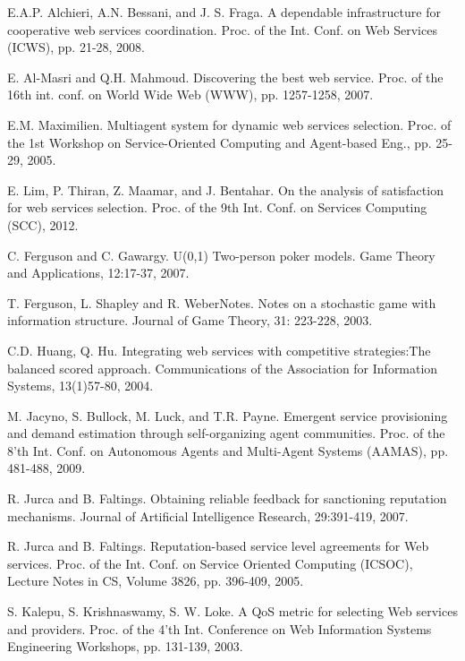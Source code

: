 \documentclass[fleqn]{singlecol-new}
\begin{document}


\begin{thebibliography}{1}

\small

E.A.P. Alchieri, A.N. Bessani, and J. S. Fraga.  A dependable
infrastructure for cooperative web services coordination. Proc. of
the Int. Conf. on Web Services (ICWS), pp. 21-28, 2008.


E. Al-Masri and Q.H. Mahmoud. Discovering the best web service.
Proc. of the 16th int. conf. on World Wide Web (WWW), pp.
1257-1258, 2007.

E.M. Maximilien. Multiagent system for dynamic web services
selection. Proc. of the 1st Workshop on Service-Oriented Computing
and Agent-based Eng., pp. 25-29, 2005.


E. Lim, P. Thiran, Z. Maamar, and J. Bentahar. On the analysis of
satisfaction for web services selection. Proc. of the 9th Int.
Conf. on Services Computing (SCC), 2012.

C. Ferguson and C. Gawargy. U(0,1) Two-person poker models. Game
Theory and Applications, 12:17-37, 2007.

T. Ferguson, L. Shapley and R. WeberNotes. Notes on a stochastic
game with information structure. Journal of Game Theory, 31:
223-228, 2003.

C.D. Huang, Q. Hu.  Integrating web services with competitive
strategies:The balanced scored approach. Communications of the
Association for Information Systems, 13(1)57-80, 2004.


M. Jacyno, S. Bullock, M. Luck, and T.R. Payne. Emergent service
provisioning and demand estimation through self-organizing agent
communities. Proc. of the 8'th Int. Conf. on Autonomous Agents and
Multi-Agent Systems (AAMAS), pp. 481-488, 2009.


R. Jurca and B. Faltings. Obtaining reliable feedback for
sanctioning reputation mechanisms. Journal of Artificial
Intelligence Research, 29:391-419, 2007.


R. Jurca and B. Faltings. Reputation-based service level
agreements for Web services. Proc. of the Int. Conf. on Service
Oriented Computing (ICSOC), Lecture Notes in CS, Volume 3826, pp.
396-409, 2005.


S. Kalepu, S. Krishnaswamy, S. W. Loke. A QoS metric for selecting
Web services and providers. Proc. of the 4'th Int. Conference on
Web Information Systems Engineering Workshops, pp. 131-139, 2003.


\end{thebibliography}
\end{document}

